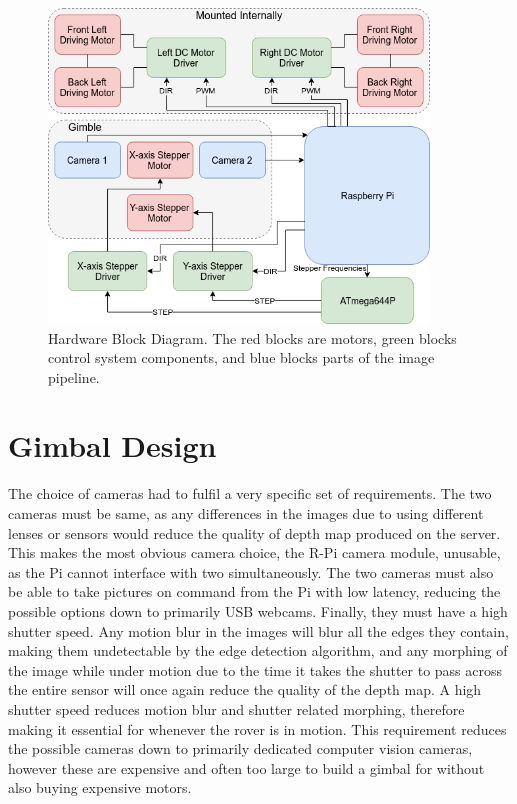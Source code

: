 \begin{figure}[H]
    \begin{center}
      \includegraphics[width=0.9\textwidth]{Figures/hardware.png}
      \caption[Hardware Block Diagram]{Hardware Block Diagram. The red blocks are motors, green blocks control system components, and blue blocks parts of the image pipeline.}
      \label{fig:hardware}
    \end{center}
\end{figure}

\section{Gimbal Design}

The choice of cameras had to fulfil a very specific set of requirements. The two cameras must be same, as any differences in the images due to using different lenses or sensors would reduce the quality of depth map produced on the server. This makes the most obvious camera choice, the R-Pi camera module, unusable, as the Pi cannot interface with two simultaneously. The two cameras must also be able to take pictures on command from the Pi with low latency, reducing the possible options down to primarily USB webcams. Finally, they must have a high shutter speed. Any motion blur in the images will blur all the edges they contain, making them undetectable by the edge detection algorithm, and any morphing of the image while under motion due to the time it takes the shutter to pass across the entire sensor will once again reduce the quality of the depth map. A high shutter speed reduces motion blur and shutter related morphing, therefore making it essential for whenever the rover is in motion. This requirement reduces the possible cameras down to primarily dedicated computer vision cameras, however these are expensive and often too large to build a gimbal for without also buying expensive motors.

